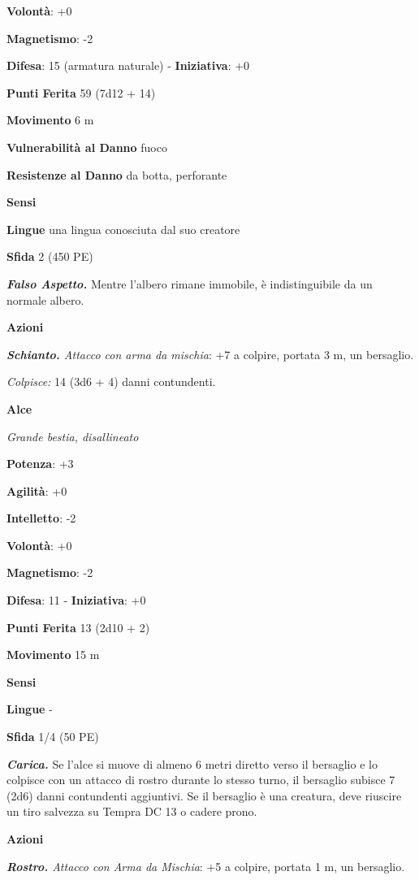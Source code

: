 \begin{multicols}{2}
\textbf{Volontà}: +0

\textbf{Magnetismo}: -2

\textbf{Difesa}: 15 (armatura naturale) - \textbf{Iniziativa}: +0

\textbf{Punti Ferita} 59 (7d12 + 14)

\textbf{Movimento} 6 m

\textbf{Vulnerabilità al Danno} fuoco

\textbf{Resistenze al Danno} da botta, perforante

\textbf{Sensi} 

\textbf{Lingue} una lingua conosciuta dal suo creatore

\textbf{Sfida} 2 (450 PE)\smallskip

\emph{\textbf{Falso Aspetto.}} Mentre l'albero rimane immobile, è
indistinguibile da un normale albero.

\smallskip\textbf{Azioni}

\emph{\textbf{Schianto.} Attacco con arma da mischia}: +7 a colpire,
portata 3 m, un bersaglio.

\emph{Colpisce:} 14 (3d6 + 4) danni contundenti.

\textbf{Alce}

\emph{Grande bestia, disallineato}

\textbf{Potenza}: +3

\textbf{Agilità}: +0

\textbf{Intelletto}: -2

\textbf{Volontà}: +0

\textbf{Magnetismo}: -2

\textbf{Difesa}: 11 - \textbf{Iniziativa}: +0

\textbf{Punti Ferita} 13 (2d10 + 2)

\textbf{Movimento} 15 m

\textbf{Sensi} 

\textbf{Lingue} -

\textbf{Sfida} 1/4 (50 PE)\smallskip

\emph{\textbf{Carica.}} Se l'alce si muove di almeno 6 metri diretto
verso il bersaglio e lo colpisce con un attacco di rostro durante lo
stesso turno, il bersaglio subisce 7 (2d6) danni contundenti aggiuntivi.
Se il bersaglio è una creatura, deve riuscire un tiro salvezza su Tempra
DC 13 o cadere prono.

\smallskip\textbf{Azioni}

\emph{\textbf{Rostro.} Attacco con Arma da Mischia}: +5 a colpire,
portata 1 m, un bersaglio.


\end{multicols}
